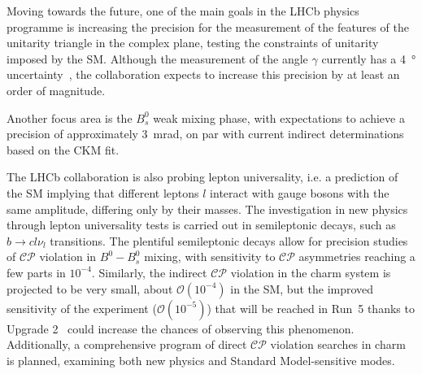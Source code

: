 

Moving towards the future, one of the main goals in the LHCb physics programme is increasing the precision for the measurement of the features of the unitarity triangle in the complex plane, testing the constraints of unitarity imposed by the SM. 
Although the measurement of the angle $\gamma$ currently has a \SI{4}{\degree} uncertainty~\cite{LHCb:2021dcr}, the collaboration expects to increase this precision by at least an order of magnitude. 

Another focus area is the $B_s^0$ weak mixing phase, with expectations to achieve a precision of approximately \SI{3}{\milli\radian}, on par with current indirect determinations based on the CKM fit.

The LHCb collaboration is also probing lepton universality, i.e. a prediction of the SM implying that different leptons $l$ interact with gauge bosons with the same amplitude, differing only by their masses.
The investigation in new physics through lepton universality tests is carried out in semileptonic decays, such as $b\rightarrow c l\nu_l$ transitions. The plentiful semileptonic decays allow for precision studies of $\mathcal{CP}$ violation in $B^0-B^0_s$ mixing, with sensitivity to $\mathcal{CP}$ asymmetries reaching a few parts in $10^{−4}$. Similarly, the indirect $\mathcal{CP}$ violation in the charm system is projected to be very small, about $\mathcal{O}(10^{-4})$ in the SM, but the improved sensitivity of the experiment ($\mathcal{O}(10^{−5})$) that will be reached in Run~5 thanks to Upgrade 2~\cite{lhcbcollaboration2019physics} could increase the chances of observing this phenomenon. Additionally, a comprehensive program of direct $\mathcal{CP}$ violation searches in charm is planned, examining both new physics and Standard Model-sensitive modes.

